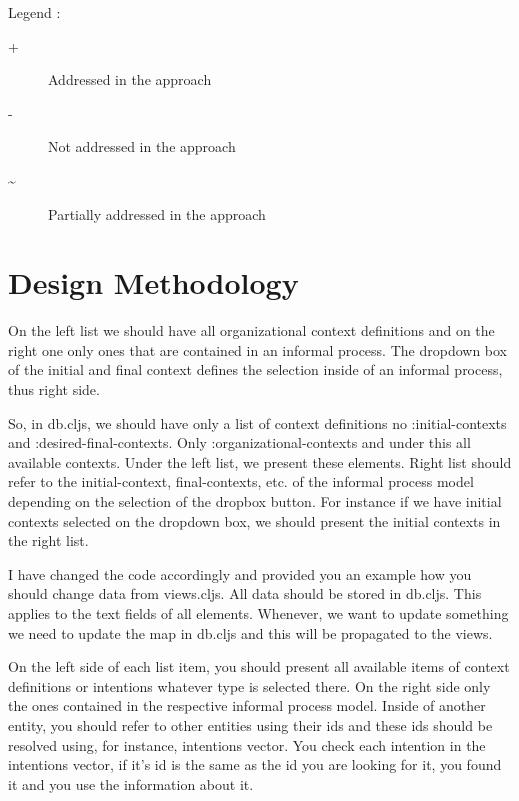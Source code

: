 Legend :
\begin{description}
	\item[+]  Addressed in the approach
	\item[-]  Not addressed in the approach
	\item[\~] Partially addressed in the approach
\end{description}

\section{Design Methodology}
\label{sec:designmethodology}

On the left list we should have all organizational context definitions and on the right one only ones that are contained in an informal process. The dropdown box of the initial and final context defines the selection inside of an informal process, thus right side.

So, in db.cljs, we should have only a list of context definitions no :initial-contexts and :desired-final-contexts. Only :organizational-contexts and under this all available contexts. Under the left list, we present these elements. Right list should refer to the initial-context, final-contexts, etc. of the informal process model depending on the selection of the dropbox button. For instance if we have initial contexts selected on the dropdown box, we should present the initial contexts in the right list.

I have changed the code accordingly and provided you an example how you should change data from views.cljs. All data should be stored in db.cljs. This applies to the text fields of all elements. Whenever, we want to update something we need to update the map in db.cljs and this will be propagated to the views.


On the left side of each list item, you should present all available items of context definitions or intentions whatever type is selected there. On the right side only the ones contained in the respective informal process model. Inside of another entity, you should refer to other entities using their ids and these ids should be resolved using, for instance, intentions vector. You check each intention in the intentions vector, if it’s id is the same as the id you are looking for it, you found it and you use the information about it.  


